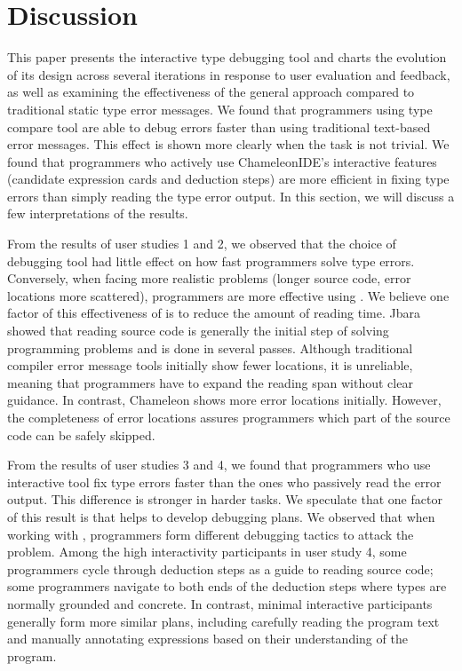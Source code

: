 \section{Discussion}
This paper presents the interactive type debugging tool \chameleon{} and charts the evolution of its design across several iterations in response to user evaluation and feedback, as well as examining the effectiveness of the general approach compared to traditional static type error messages. We found that programmers using \chameleon{} type compare tool are able to debug errors faster than using traditional text-based error messages. This effect is shown more clearly when the task is not trivial. We found that programmers who actively use ChameleonIDE's interactive features (candidate expression cards and deduction steps) are more efficient in fixing type errors than simply reading the type error output. In this section, we will discuss a few interpretations of the results.


From the results of user studies 1 and 2, we observed that the choice of debugging tool had little effect on how fast programmers solve type errors. Conversely, when facing more realistic problems (longer source code, error locations more scattered), programmers are more effective using \chameleon{}. We believe one factor of this effectiveness of \chameleon{} is to reduce the amount of reading time. Jbara \cite{jbara2017programmers} showed that reading source code is generally the initial step of solving programming problems and is done in several passes. Although traditional compiler error message tools initially show fewer locations, it is unreliable, meaning that programmers have to expand the reading span without clear guidance. In contrast, Chameleon shows more error locations initially. However, the completeness of error locations assures programmers which part of the source code can be safely skipped.


From the results of user studies 3 and 4, we found that programmers who use interactive tool fix type errors faster than the ones who passively read the error output. This difference is stronger in harder tasks. We speculate that one factor of this result is that  \chameleon{} helps to develop debugging plans. We observed that when working with \chameleon{}, programmers form different debugging tactics to attack the problem. Among the high interactivity participants in user study 4, some programmers cycle through deduction steps as a guide to reading source code; some programmers navigate to both ends of the deduction steps where types are normally grounded and concrete. In contrast, minimal interactive participants generally form more similar plans, including carefully reading the program text and manually annotating expressions based on their understanding of the program.

